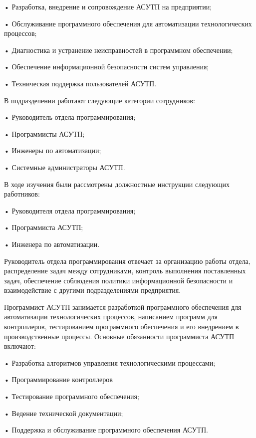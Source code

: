 {  \par \redline • Разработка, внедрение и сопровождение АСУТП на предприятии;
  \par \redline • Обслуживание программного обеспечения для автоматизации технологических процессов;
  \par \redline • Диагностика и устранение неисправностей в программном обеспечении;
  \par \redline • Обеспечение информационной безопасности систем управления;
  \par \redline • Техническая поддержка пользователей АСУТП.
  \par \redline В подразделении работают следующие категории сотрудников:
  \par \redline • Руководитель отдела программирования;
  \par \redline • Программисты АСУТП;
  \par \redline • Инженеры по автоматизации;
  \par \redline • Системные администраторы АСУТП.
  \par \redline В ходе изучения были рассмотрены должностные инструкции следующих работников:
  \par \redline • Руководителя отдела программирования;
  \par \redline • Программиста АСУТП;
  \par \redline • Инженера по автоматизации.
  \par \redline Руководитель отдела программирования отвечает за организацию работы отдела, распределение задач между сотрудниками, контроль выполнения поставленных задач, обеспечение соблюдения политики информационной безопасности и взаимодействие с другими подразделениями предприятия.
  \par \redline Программист АСУТП занимается разработкой программного обеспечения для автоматизации технологических процессов, написанием программ для контроллеров, тестированием программного обеспечения и его внедрением в производственные процессы. Основные обязанности программиста АСУТП включают:
  \par \redline • Разработка алгоритмов управления технологическими процессами;
  \par \redline • Программирование контроллеров
  \par \redline • Тестирование программного обеспечения;
  \par \redline • Ведение технической документации;
  \par \redline • Поддержка и обслуживание программного обеспечения АСУТП.
}

